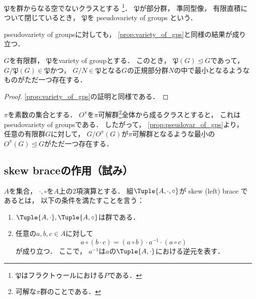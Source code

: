 \documentclass{jlreq}
\newcommand{\Term}[2][\relax]{%
	\textsf{#2} \if#1\relax\else{（\textsf{#1}）}\fi%
}
\begin{document}
	\begin{definition}
		$\mathfrak{P}$を群からなる空でないクラスとする
		\footnote{$\mathfrak{P}$はフラクトゥールにおける$P$である．
		}．
		$\mathfrak{P}$が部分群，
		準同型像，
		有限直積について閉じているとき，
		$\mathfrak{P}$を\Term{pseudovariety of groups}という．
	\end{definition}
	
	pseudovariety of groupsに対しても，
	\cref{prop:variety_of_gps}と同様の結果が成り立つ．
	
	\begin{proposition}\label{prop:pseudovar_of_gps}
		$G$を有限群，
		$\mathfrak{P}$をvariety of groupとする．
		このとき，
		$\mathfrak{P}(G) \trianglelefteq G$であって，
		$G/\mathfrak{P}(G) \in \mathfrak{P}$かつ，
		$G/N \in \mathfrak{P}$となる$G$の正規部分群$N$の中で最小となるようなものがただ一つ存在する．
	\end{proposition}
	
	\begin{proof}
		\cref{prop:variety_of_gps}の証明と同様である．
	\end{proof}
	
	\begin{example}
		$\pi$を素数の集合とする．
		$O^\pi$を$\pi$可解群\footnote{可解な$\pi$群のことである．}全体から成るクラスとすると，
		これはpseudovariety of groupsである．
		したがって，
		\cref{prop:pseudovar_of_gps}より，
		任意の有限群$G$に対して，
		$G/O^\pi(G)$が$\pi$可解群となるような最小の$O^\pi(G) \trianglelefteq G$がただ一つ存在する．
	\end{example}
	
	\subsection{skew braceの作用（試み）}
	
	\begin{definition}
		$A$を集合，
		$\cdot, \circ$を$A$上の2項演算とする．
		組$\Tuple{A, \cdot, \circ}$が\Term{skew (left) brace}であるとは，
		以下の条件を満たすことを言う：
		\begin{enumerate}
			\item $\Tuple{A, \cdot}, \Tuple{A, \circ}$は群である．
			\item 任意の$a, b, c \in A$に対して
			\begin{equation}
				a \circ (b \cdot c) = (a \circ b) \cdot a^{-1} \cdot (a \circ c)
			\end{equation}
			が成り立つ．
			ここで，
			$a^{-1}$は$a$の$\Tuple{A, \cdot}$における逆元を表す．
		\end{enumerate}
	\end{definition}
	
\end{document}

